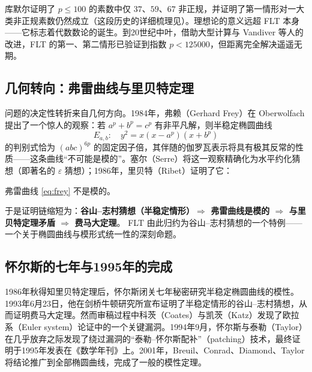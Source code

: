 库默尔证明了 $p \le 100$ 的素数中仅 $37$、$59$、$67$ 非正规，并证明了第一情形对一大类非正规素数仍然成立（这段历史的详细梳理见\cite{edwards1977fermat}）。理想论的意义远超 FLT 本身——它标志着代数数论的诞生。到20世纪中叶，借助大型计算与 Vandiver 等人的改进，FLT 的第一、第二情形已验证到指数 $p < 125000$，但距离完全解决遥遥无期。

\subsection{几何转向：弗雷曲线与里贝特定理}

问题的决定性转折来自几何方向。1984年，弗赖（Gerhard Frey）在 Oberwolfach 提出了一个惊人的观察\cite{frey1986links}：若 $a^p + b^p = c^p$ 有非平凡解，则半稳定椭圆曲线
\begin{equation}\label{eq:frey}
    E_{a,b}: \quad y^2 = x(x - a^p)(x + b^p)
\end{equation}
的判别式恰为 $(abc)^{6p}$ 的固定因子倍，其伴随的伽罗瓦表示将具有极其反常的性质——这条曲线“不可能是模的”。塞尔（Serre）将这一观察精确化为水平约化猜想（即著名的 $\varepsilon$ 猜想）\cite{serre1987letters}；1986年，里贝特（Ribet）证明了它\cite{ribet1990galois}：

\begin{theorem}[里贝特定理，1986]
    弗雷曲线 \cref{eq:frey} 不是模的。
\end{theorem}

于是证明链缩短为：\textbf{谷山--志村猜想（半稳定情形）$\Rightarrow$ 弗雷曲线是模的 $\Rightarrow$ 与里贝特定理矛盾 $\Rightarrow$ 费马大定理}。 FLT 由此归约为谷山--志村猜想\cite{taniyama1955problems}的一个特例——一个关于椭圆曲线与模形式统一性的深刻命题。

\subsection{怀尔斯的七年与1995年的完成}

1986年秋得知里贝特定理后，怀尔斯闭关七年秘密研究半稳定椭圆曲线的模性。1993年6月23日，他在剑桥牛顿研究所宣布证明了半稳定情形的谷山--志村猜想，从而证明费马大定理。然而审稿过程中科茨（Coates）与凯茨（Katz）发现了欧拉系（Euler system）论证中的一个关键漏洞。1994年9月，怀尔斯与泰勒（Taylor）在几乎放弃之际发现了绕过漏洞的“泰勒--怀尔斯配补”（patching）技术\cite{taylor1995ring}，最终证明于1995年发表在《数学年刊》上\cite{wiles1995modular}。2001年，Breuil、Conrad、Diamond、Taylor 将结论推广到全部椭圆曲线，完成了一般的模性定理\cite{breuil2001modularity}。
